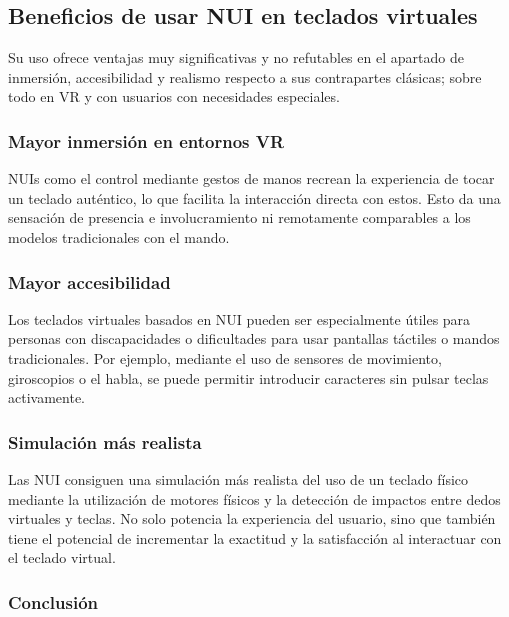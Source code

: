 \subsection{Beneficios de usar NUI en teclados virtuales}

\label{Beneficion_NUIs}

Su uso ofrece ventajas muy significativas y no refutables en el apartado de inmersión, accesibilidad y realismo respecto a sus contrapartes clásicas; sobre todo en VR y con usuarios con necesidades especiales. 

\subsubsection{Mayor inmersión en entornos VR}

NUIs como el control mediante gestos de manos recrean la experiencia de tocar un teclado auténtico, lo que facilita la interacción directa con estos. Esto da una sensación de presencia e involucramiento ni remotamente comparables a los modelos tradicionales con el mando. \cite{Frazier2018An}

\subsubsection{Mayor accesibilidad}

Los teclados virtuales basados en NUI pueden ser especialmente útiles para personas con discapacidades o dificultades para usar pantallas táctiles o mandos tradicionales. Por ejemplo, mediante el uso de sensores de movimiento, giroscopios o el habla, se puede permitir introducir caracteres sin pulsar teclas activamente. \cite{Kim2014Message}

\subsubsection{Simulación más realista}

Las NUI consiguen una simulación más realista del uso de un teclado físico mediante la utilización de motores físicos y la detección de impactos entre dedos virtuales y teclas. No solo potencia la experiencia del usuario, sino que también tiene el potencial de incrementar la exactitud y la satisfacción al interactuar con el teclado virtual. \cite{Frazier2018An}

\subsubsection{Conclusión}

